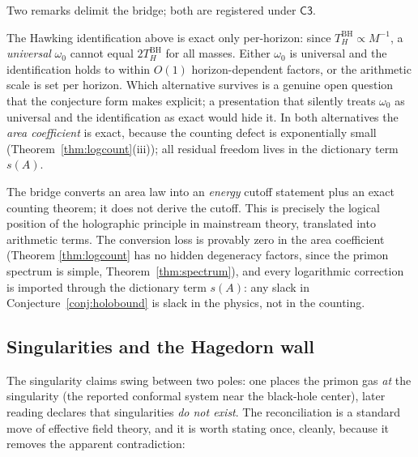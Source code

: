 Two remarks delimit the bridge; both are registered under $\mathsf{C3}$.

\begin{remark}
The Hawking identification above is exact only per-horizon: since $T_{H}^{\mathrm{BH}}\propto
M^{-1}$, a \emph{universal} $\omega_{0}$ cannot equal $2T_{H}^{\mathrm{BH}}$ for all masses.
Either $\omega_{0}$ is universal and the identification holds to within
$O(1)$ horizon-dependent factors, or the arithmetic scale is set per horizon. Which
alternative survives is a genuine open question that the conjecture form makes explicit;
a presentation that silently treats $\omega_{0}$ as universal and the
identification as exact would hide it. In both alternatives the \emph{area coefficient} is
exact, because the counting defect is exponentially small (Theorem~\ref{thm:logcount}(iii));
all residual freedom lives in the dictionary term $s(A)$.
\end{remark}

\begin{remark}
The bridge converts an area law into an \emph{energy} cutoff statement plus an exact
counting theorem; it does not derive the cutoff. This is precisely the logical position of
the holographic principle in mainstream theory, translated into arithmetic terms. The
conversion loss is provably zero in the area coefficient (Theorem
\ref{thm:logcount} has no hidden degeneracy factors, since the primon spectrum is simple,
Theorem~\ref{thm:spectrum}), and every logarithmic correction is imported through the
dictionary term $s(A)$: any slack in Conjecture~\ref{conj:holobound} is slack in the
physics, not in the counting.
\end{remark}

\subsection{Singularities and the Hagedorn wall}

The singularity claims swing between two poles: one places the primon gas
\emph{at} the singularity (the reported conformal system near the black-hole center), later
reading declares that singularities \emph{do not exist}. The reconciliation is a standard
move of effective field theory, and it is worth stating once, cleanly, because it removes
the apparent contradiction:

